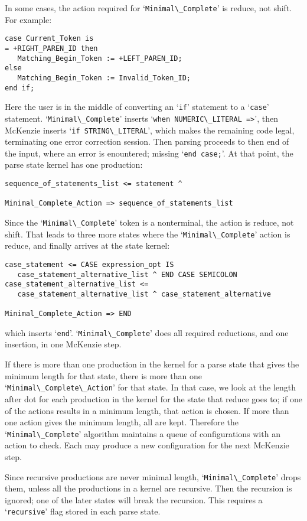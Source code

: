\documentclass{article}
\newcommand{\code}[1]{`\lstinline|#1|'}
\begin{document}
In some cases, the action required for \code{Minimal\_Complete} is
reduce, not shift. For example:
\begin{lstlisting}
case Current_Token is
= +RIGHT_PAREN_ID then
   Matching_Begin_Token := +LEFT_PAREN_ID;
else
   Matching_Begin_Token := Invalid_Token_ID;
end if;
\end{lstlisting}
Here the user is in the middle of converting an \code{if} statement to
a \code{case} statement. \code{Minimal\_Complete} inserts
\code{when NUMERIC\_LITERAL =>}, then McKenzie inserts
\code{if STRING\_LITERAL}, which makes the remaining code legal,
terminating one error correction session. Then parsing proceeds to
then end of the input, where an error is enountered; missing
\code{end case;}. At that point, the parse state kernel has one
production:
\begin{verbatim}
sequence_of_statements_list <= statement ^

Minimal_Complete_Action => sequence_of_statements_list
\end{verbatim}
Since the \code{Minimal\_Complete} token is a nonterminal, the action
is reduce, not shift. That leads to three more states where the
\code{Minimal\_Complete} action is reduce, and finally arrives at the
state kernel:
\begin{verbatim}
case_statement <= CASE expression_opt IS
   case_statement_alternative_list ^ END CASE SEMICOLON
case_statement_alternative_list <=
   case_statement_alternative_list ^ case_statement_alternative

Minimal_Complete_Action => END
\end{verbatim}
which inserts \code{end}. \code{Minimal\_Complete} does all required
reductions, and one insertion, in one McKenzie step.

If there is more than one production in the kernel for a parse state
that gives the minimum length for that state, there is more than one
\code{Minimal\_Complete\_Action} for that state. In that case, we look
at the length after dot for each production in the kernel for the
state that reduce goes to; if one of the actions results in a minimum
length, that action is chosen. If more than one action gives the
minimum length, all are kept. Therefore the \code{Minimal\_Complete}
algorithm maintains a queue of configurations with an action to check.
Each may produce a new configuration for the next McKenzie step.

Since recursive productions are never minimal length,
\code{Minimal\_Complete} drops them, unless all the productions in a
kernel are recursive. Then the recursion is ignored; one of the later
states will break the recursion. This requires a \code{recursive} flag
stored in each parse state.
\end{document}
